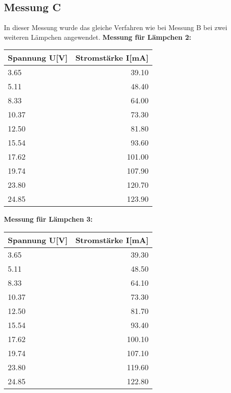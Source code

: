 \documentclass[12pt, a4paper, twoside]{article}
\begin{document}
    \subsection{Messung C}
    In dieser Messung wurde das gleiche Verfahren wie bei Messung B bei zwei weiteren Lämpchen angewendet.
    \newpage
    \textbf{Messung für Lämpchen 2:}\\
    \begin{center}
        \begin{tabular}{l|r}
            \textbf{Spannung U[V]} & \textbf{Stromstärke I[mA]}\\
            \hline
            3.65 & 39.10\\
            5.11 & 48.40\\
            8.33 & 64.00\\
            10.37 & 73.30\\
            12.50 & 81.80\\
            15.54 & 93.60\\
            17.62 & 101.00\\
            19.74 & 107.90\\
            23.80 & 120.70\\
            24.85 & 123.90
        \end{tabular}
    \end{center}
    \vspace{1cm}
    \textbf{Messung für Lämpchen 3:}\\
    \begin{center}
        \begin{tabular}{l|r}
            \textbf{Spannung U[V]} & \textbf{Stromstärke I[mA]}\\
            \hline
            3.65 & 39.30\\
            5.11 & 48.50\\
            8.33 & 64.10\\
            10.37 & 73.30\\
            12.50 & 81.70\\
            15.54 & 93.40\\
            17.62 & 100.10\\
            19.74 & 107.10\\
            23.80 & 119.60\\
            24.85 & 122.80
        \end{tabular}
    \end{center}
\end{document}
